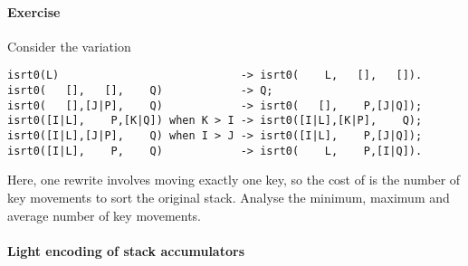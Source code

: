 \paragraph{Exercise}

Consider the variation
{\small
\begin{verbatim}
isrt0(L)                            -> isrt0(    L,   [],   []).
isrt0(   [],   [],    Q)            -> Q;
isrt0(   [],[J|P],    Q)            -> isrt0(   [],    P,[J|Q]);
isrt0([I|L],    P,[K|Q]) when K > I -> isrt0([I|L],[K|P],    Q);
isrt0([I|L],[J|P],    Q) when I > J -> isrt0([I|L],    P,[J|Q]);
isrt0([I|L],    P,    Q)            -> isrt0(    L,    P,[I|Q]).
\end{verbatim}
}
Here, one rewrite involves moving exactly one key, so the cost of
 is the number of key movements to sort the original
stack. Analyse the minimum, maximum and average number of key
movements.

\paragraph{Light encoding of stack accumulators}

